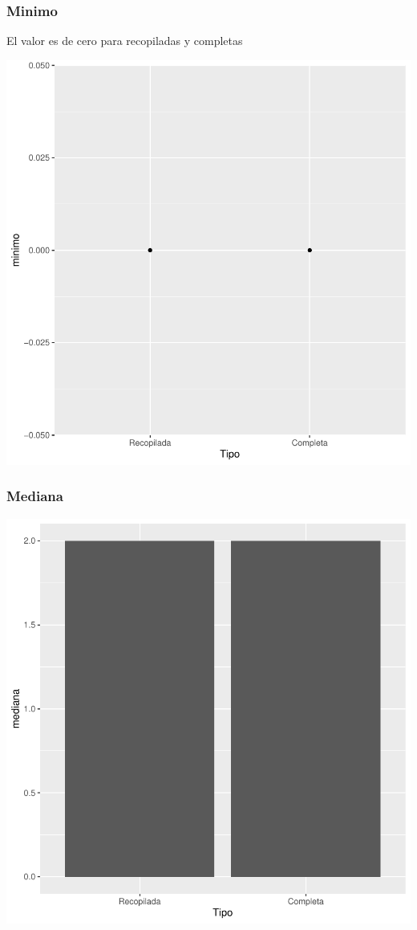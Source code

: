 \documentclass{article}
\begin{document}
\subsubsection{Minimo}
El valor es de cero para recopiladas y completas

\includegraphics{seguimento2-006}

\subsubsection{Mediana}

\includegraphics{seguimento2-007}
\end{document}

